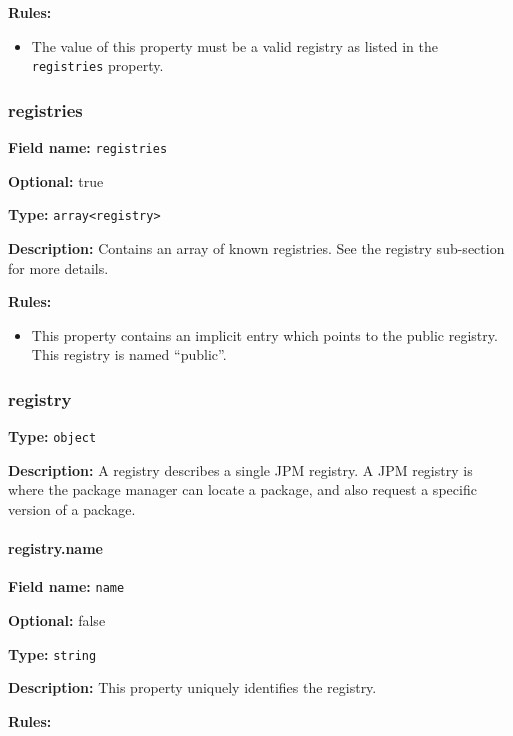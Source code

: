 \textbf{Rules:}

\begin{itemize}
\tightlist
\item
  The value of this property must be a valid registry as listed in the
  \texttt{registries} property.
\end{itemize}

\hypertarget{registries}{\subsubsection{registries}\label{registries}}

\textbf{Field name:} \texttt{registries}

\textbf{Optional:} true

\textbf{Type:} \texttt{array\textless{}registry\textgreater{}}

\textbf{Description:} Contains an array of known registries. See the
registry sub-section for more details.

\textbf{Rules:}

\begin{itemize}
\tightlist
\item
  This property contains an implicit entry which points to the public
  registry. This registry is named ``public''.
\end{itemize}

\hypertarget{registry-1}{\subsubsection{registry}\label{registry-1}}

\textbf{Type:} \texttt{object}

\textbf{Description:} A registry describes a single JPM registry. A JPM
registry is where the package manager can locate a package, and also
request a specific version of a package.

\hypertarget{name-2}{\paragraph{registry.name}\label{name-2}}

\textbf{Field name:} \texttt{name}

\textbf{Optional:} false

\textbf{Type:} \texttt{string}

\textbf{Description:} This property uniquely identifies the registry.

\textbf{Rules:}


